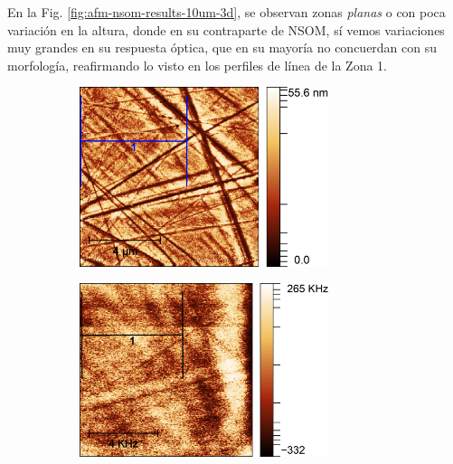 En la Fig. \ref{fig:afm-nsom-results-10um-3d}, se observan zonas \textit{planas} o con poca variación en la altura, donde en su contraparte de NSOM, sí vemos variaciones muy grandes en su respuesta óptica, que en su mayoría no concuerdan con su morfología, reafirmando lo visto en los perfiles de línea de la Zona 1.

\begin{figure}[H]
    \centering
    \begin{subfigure}[b]{0.45\textwidth}
        \centering
        \includegraphics[width = 0.8\textwidth]{figures/chap4/cdte-ag/afm-nsom-results/10um/CdTe_Ag_10um_afm.jpg}
    \end{subfigure}\hfill
    \begin{subfigure}[b]{0.45\textwidth}
        \centering
        \includegraphics[width = 0.8\textwidth]{figures/chap4/cdte-ag/afm-nsom-results/10um/CdTe_Ag_10um_nsom.jpg}
    \end{subfigure}


\end{figure}

